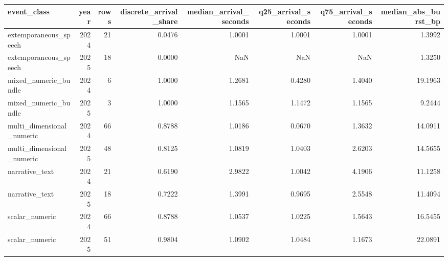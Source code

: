 \begin{tabular}{lrrrrrrr}
\toprule
event_class & year & rows & discrete_arrival_share & median_arrival_seconds & q25_arrival_seconds & q75_arrival_seconds & median_abs_burst_bp \\
\midrule
extemporaneous_speech & 2024 & 21 & 0.0476 & 1.0001 & 1.0001 & 1.0001 & 1.3992 \\
extemporaneous_speech & 2025 & 18 & 0.0000 & NaN & NaN & NaN & 1.3250 \\
mixed_numeric_bundle & 2024 & 6 & 1.0000 & 1.2681 & 0.4280 & 1.4040 & 19.1963 \\
mixed_numeric_bundle & 2025 & 3 & 1.0000 & 1.1565 & 1.1472 & 1.1565 & 9.2444 \\
multi_dimensional_numeric & 2024 & 66 & 0.8788 & 1.0186 & 0.0670 & 1.3632 & 14.0911 \\
multi_dimensional_numeric & 2025 & 48 & 0.8125 & 1.0819 & 1.0403 & 2.6203 & 14.5655 \\
narrative_text & 2024 & 21 & 0.6190 & 2.9822 & 1.0042 & 4.1906 & 11.1258 \\
narrative_text & 2025 & 18 & 0.7222 & 1.3991 & 0.9695 & 2.5548 & 11.4094 \\
scalar_numeric & 2024 & 66 & 0.8788 & 1.0537 & 1.0225 & 1.5643 & 16.5455 \\
scalar_numeric & 2025 & 51 & 0.9804 & 1.0902 & 1.0484 & 1.1673 & 22.0891 \\
\bottomrule
\end{tabular}
